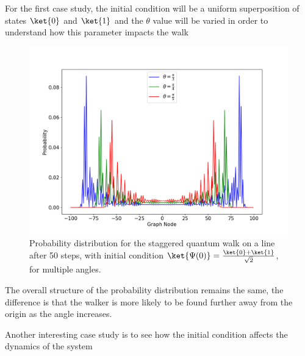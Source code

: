                 For the first case study, the initial condition will be a uniform superposition of states $\ket{0}$ and $\ket{1}$ and the $\theta$ value will be varied in order to understand how this parameter impacts the walk
                
            	\begin{figure}[!h]
                    \centering
                    \includegraphics[scale=0.40]{img/StagQuantumWalk/stagqwMultiple.png}
                    \caption{Probability distribution for the staggered quantum walk on a line after 50 steps, with initial condition $\ket{\Psi(0)}=\frac{\ket{0}+\ket{1}}{\sqrt{2}}$, for multiple angles.} 
                    \label{fig:fig5}
                \end{figure}
                
                The overall structure of the probability distribution remains the same, the difference is that the walker is more likely to be found further away from the origin as the angle increases.\par
                Another interesting case study is to see how the initial condition affects the dynamics of the system
                
